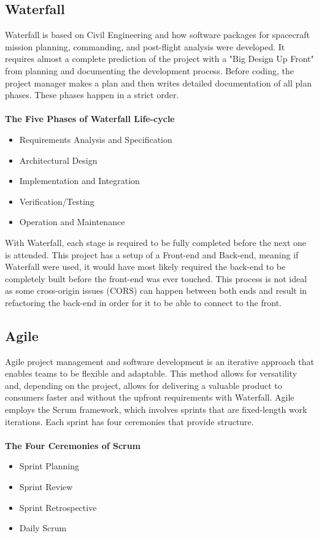 \subsection{Waterfall}
Waterfall is based on Civil Engineering and how software packages for spacecraft mission planning, commanding, and post-flight analysis were developed. \cite{ref2} It requires almost a complete prediction of the project with a "Big Design Up Front" from planning and documenting the development process. Before coding, the project manager makes a plan and then writes detailed documentation of all plan phases. These phases happen in a strict order. \cite{ref3}
\\\\ \textbf{The Five Phases of Waterfall Life-cycle}
\begin{itemize}
    \item Requirements Analysis and Specification
    \item Architectural Design
    \item Implementation and Integration
    \item Verification/Testing
    \item Operation and Maintenance
\end{itemize}

With Waterfall, each stage is required to be fully completed before the next one is attended. This project has a setup of a Front-end and Back-end, meaning if Waterfall were used, it would have most likely required the back-end to be completely built before the front-end was ever touched. This process is not ideal as some cross-origin issues (CORS) can happen between both ends and result in refactoring the back-end in order for it to be able to connect to the front.

\subsection{Agile}
Agile project management and software development is an iterative approach that enables teams to be flexible and adaptable. This method allows for versatility and, depending on the project, allows for delivering a valuable product to consumers faster and without the upfront requirements with Waterfall. Agile employs the Scrum framework, which involves sprints that are fixed-length work iterations. Each sprint has four ceremonies that provide structure. \cite{ref4}
\\\\ \textbf{The Four Ceremonies of Scrum}
\begin{itemize}
    \item Sprint Planning
    \item Sprint Review
    \item Sprint Retrospective
    \item Daily Scrum
\end{itemize}

